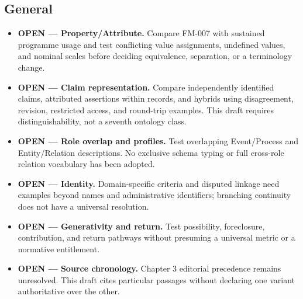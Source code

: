 \documentclass[11pt,a4paper]{article}
\begin{document}
\subsection{General}

\begin{itemize}
\item \textbf{OPEN --- Property/Attribute.} Compare FM-007 with sustained programme usage and test conflicting value assignments, undefined values, and nominal scales before deciding equivalence, separation, or a terminology change.
\item \textbf{OPEN --- Claim representation.} Compare independently identified claims, attributed assertions within records, and hybrids using disagreement, revision, restricted access, and round-trip examples. This draft requires distinguishability, not a seventh ontology class.
\item \textbf{OPEN --- Role overlap and profiles.} Test overlapping Event/Process and Entity/Relation descriptions. No exclusive schema typing or full cross-role relation vocabulary has been adopted.
\item \textbf{OPEN --- Identity.} Domain-specific criteria and disputed linkage need examples beyond names and administrative identifiers; branching continuity does not have a universal resolution.
\item \textbf{OPEN --- Generativity and return.} Test possibility, foreclosure, contribution, and return pathways without presuming a universal metric or a normative entitlement.
\item \textbf{OPEN --- Source chronology.} Chapter 3 editorial precedence remains unresolved. This draft cites particular passages without declaring one variant authoritative over the other.
\end{itemize}
\end{document}
